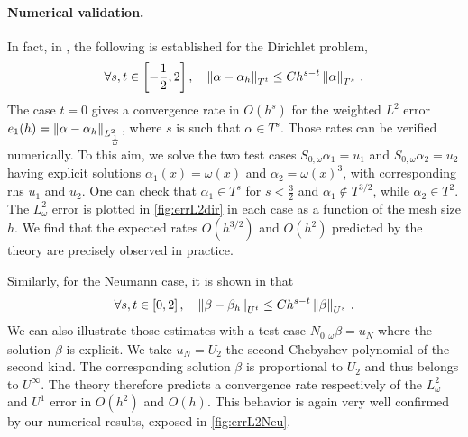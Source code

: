 \documentclass[a4paper]{article}
\begin{document}
\paragraph{Numerical validation.}
In fact, in \cite{averseng}, the following is established for the Dirichlet problem,
\[\forall s,t \in \left[-\frac{1}{2},2\right], \quad \left\|\alpha - \alpha_h\right\|_{T^t} \leq C h^{s - t}\left\|\alpha\right\|_{T^s}\,.\] 
The case $t = 0$ gives a convergence rate in $O(h^s)$ for the weighted $L^2 $ error $e_1(h) = \left\|\alpha - \alpha_h\right\|_{L^2_\frac{1}{\omega}}$, where $s$ is such that $\alpha \in T^s$. Those rates can be verified numerically. To this aim, we solve the two test cases $S_{0,\omega} \alpha_1 = u_1$ and $S_{0,\omega} \alpha_2 = u_2$ having explicit solutions $\alpha_1(x) = \omega(x)$ and $\alpha_2 = \omega(x)^3$, with corresponding rhs $u_1$ and $u_2$. One can check that $\alpha_1 \in T^{s}$ for $s < \frac{3}{2}$ and $\alpha_1 \notin T^{3/2}$, while $\alpha_2 \in T^2$. The $L^2_\omega$ error is plotted in \autoref{fig:errL2dir} in each case as a function of the mesh size $h$. We find that the expected rates $O(h^{3/2})$ and $O(h^2)$ predicted by the theory are precisely observed in practice.  

Similarly, for the Neumann case, it is shown in \cite{averseng} that
\begin{equation}
\forall s,t \in\left[0, 2\right], \quad \left\|\beta - \beta_h\right\|_{U^t} \leq Ch^{s - t}\left\|\beta\right\|_{U^s}\,.
\label{estimUsUt}
\end{equation} 
We can also illustrate those estimates with a test case $N_{0,\omega} \beta = u_N$ where the solution $\beta$ is explicit. We take $u_N = U_2$ the second Chebyshev polynomial of the second kind. The corresponding solution $\beta$ is proportional to $U_2$ and thus belongs to $U^\infty$. The theory therefore predicts a convergence rate respectively of the $L^2_\omega$ and $U^1$ error in $O(h^2)$ and $O(h)$. This behavior is again very well confirmed by our numerical results, exposed in \autoref{fig:errL2Neu}. 
\end{document}
